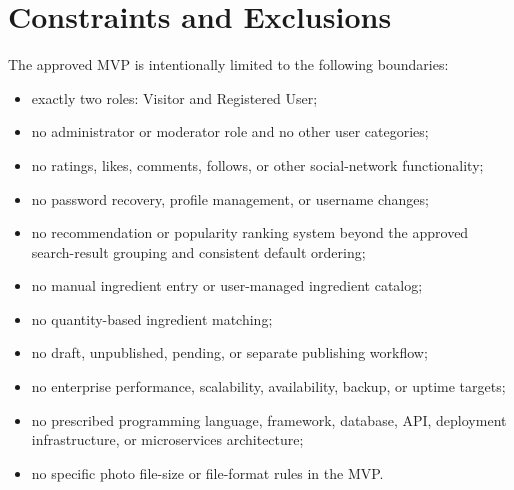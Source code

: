 \documentclass[12pt]{article}
\begin{document}
\section{Constraints and Exclusions}
The approved MVP is intentionally limited to the following boundaries:
\begin{itemize}
    \item exactly two roles: Visitor and Registered User;
    \item no administrator or moderator role and no other user categories;
    \item no ratings, likes, comments, follows, or other social-network functionality;
    \item no password recovery, profile management, or username changes;
    \item no recommendation or popularity ranking system beyond the approved search-result grouping and consistent default ordering;
    \item no manual ingredient entry or user-managed ingredient catalog;
    \item no quantity-based ingredient matching;
    \item no draft, unpublished, pending, or separate publishing workflow;
    \item no enterprise performance, scalability, availability, backup, or uptime targets;
    \item no prescribed programming language, framework, database, API, deployment infrastructure, or microservices architecture;
    \item no specific photo file-size or file-format rules in the MVP.
\end{itemize}
\end{document}
